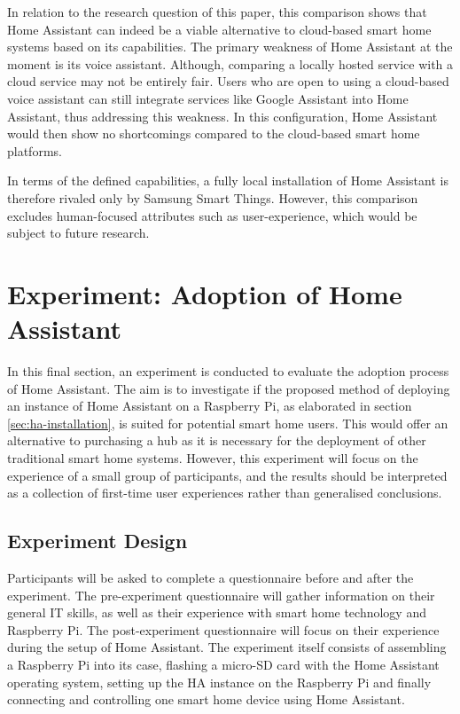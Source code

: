 \newpage

In relation to the research question of this paper, this comparison shows that Home Assistant can indeed be a viable alternative to cloud-based smart home systems based on its capabilities. The primary weakness of Home Assistant at the moment is its voice assistant. Although, comparing a locally hosted service with a cloud service may not be entirely fair. Users who are open to using a cloud-based voice assistant can still integrate services like Google Assistant into Home Assistant, thus addressing this weakness. In this configuration, Home Assistant would then show no shortcomings compared to the cloud-based smart home platforms.

In terms of the defined capabilities, a fully local installation of Home Assistant is therefore rivaled only by Samsung Smart Things. However, this comparison excludes human-focused attributes such as user-experience, which would be subject to future research.


\section{Experiment: Adoption of Home Assistant}
In this final section, an experiment is conducted to evaluate the adoption process of Home Assistant. The aim is to investigate if the proposed method of deploying an instance of Home Assistant on a Raspberry Pi, as elaborated in section \ref{sec:ha-installation}, is suited for potential smart home users. This would offer an alternative to purchasing a hub as it is necessary for the deployment of other traditional smart home systems. However, this experiment will focus on the experience of a small group of participants, and the results should be interpreted as a collection of first-time user experiences rather than generalised conclusions.

\subsection{Experiment Design}
Participants will be asked to complete a questionnaire before and after the experiment. The pre-experiment questionnaire will gather information on their general IT skills, as well as their experience with smart home technology and Raspberry Pi. The post-experiment questionnaire will focus on their experience during the setup of Home Assistant. The experiment itself consists of assembling a Raspberry Pi into its case, flashing a micro-SD card with the Home Assistant operating system, setting up the HA instance on the Raspberry Pi and finally connecting and controlling one smart home device using Home Assistant.


